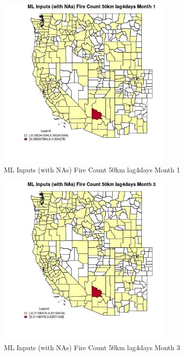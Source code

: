 \begin{figure} 
\centering  
\includegraphics[width=0.77\textwidth]{Code_Outputs/Report_ML_input_PM25_Step4_part_e_de_duplicated_aves_compiled_2019-05-20wNAs_CountyFire_Count_50km_lag4daysmedianMonth1.jpg} 
\caption{\label{fig:Report_ML_input_PM25_Step4_part_e_de_duplicated_aves_compiled_2019-05-20wNAsCountyFire_Count_50km_lag4daysmedianMonth1}ML Inputs (with NAs) Fire Count 50km lag4days Month 1} 
\end{figure} 
 

\begin{figure} 
\centering  
\includegraphics[width=0.77\textwidth]{Code_Outputs/Report_ML_input_PM25_Step4_part_e_de_duplicated_aves_compiled_2019-05-20wNAs_CountyFire_Count_50km_lag4daysmedianMonth3.jpg} 
\caption{\label{fig:Report_ML_input_PM25_Step4_part_e_de_duplicated_aves_compiled_2019-05-20wNAsCountyFire_Count_50km_lag4daysmedianMonth3}ML Inputs (with NAs) Fire Count 50km lag4days Month 3} 
\end{figure} 
 

